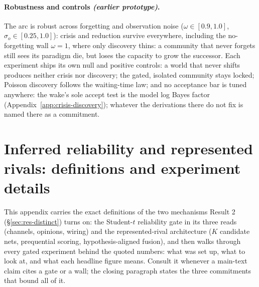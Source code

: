 \documentclass[runningheads]{llncs}
\begin{document}
\paragraph{Robustness and controls \emph{(earlier prototype)}.}
The arc is robust across forgetting and observation noise ($\omega\in[0.9,1.0]$,
$\sigma_o\in[0.25,1.0]$): crisis and reduction survive everywhere, including the
no-forgetting wall $\omega=1$, where only discovery thins: a community that never forgets
still sees its paradigm die, but loses the capacity to grow the successor. Each experiment
ships its own null and positive controls: a world that never shifts produces neither crisis
nor discovery; the gated, isolated community stays locked; Poisson discovery follows the
waiting-time law; and no acceptance bar is tuned anywhere: the wake's sole accept test is
the model log Bayes factor (Appendix~\ref{app:crisis-discovery}); whatever the derivations
there do not fix is named there as a commitment.

\section{Inferred reliability and represented rivals: definitions and experiment details}
\label{app:reliability}

This appendix carries the exact definitions of the two mechanisms Result 2
(\S\ref{sec:res-distinct}) turns on: the Student-$t$ reliability gate in its three reads
(channels, opinions, wiring) and the represented-rival architecture ($K$ candidate nets,
prequential scoring, hypothesis-aligned fusion), and then walks through every gated
experiment behind the quoted numbers: what was set up, what to look at, and what each
headline figure means. Consult it whenever a main-text claim cites a gate or a wall; the
closing paragraph states the three commitments that bound all of it.
\end{document}
